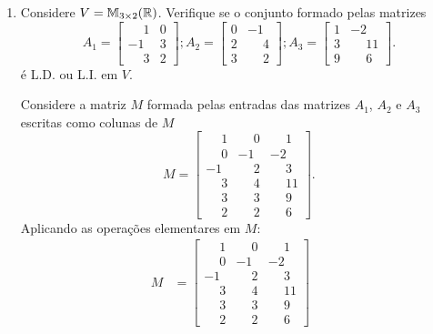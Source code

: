 \begin{exemplo}
\begin{enumerate}[label={\arabic*})]
		\item Considere $V = \mathbb{M}_{3\times 2}(\mathbb{R})$. Verifique se o conjunto formado pelas matrizes
		\[
			A_1 = \begin{bmatrix}
				\phantom{-}1 & 0\\
				-1 & 3\\
				\phantom{-}3 & 2
			\end{bmatrix}; A_2 = \begin{bmatrix}
				0 & -1\\
				2 & \phantom{-}4\\
				3 & \phantom{-}2
			\end{bmatrix}; A_3 = \begin{bmatrix}
				1 & -2\\
				3 & \phantom{-}11\\
				9 & \phantom{-}6
			\end{bmatrix}.
		\]
		\'e L.D. ou L.I. em $V$.
		\begin{solucao}
			Considere a matriz $M$ formada pelas entradas das matrizes $A_1$, $A_2$ e $A_3$ escritas como colunas de $M$
			\[
				M = \begin{bmatrix}
					\phantom{-}1 & \phantom{-}0 & \phantom{-}1\\
					\phantom{-}0 & -1 & -2\\
					-1 & \phantom{-}2 & \phantom{-}3\\
					\phantom{-}3 & \phantom{-}4 & \phantom{-}11\\
					\phantom{-}3 & \phantom{-}3 & \phantom{-}9\\
					\phantom{-}2 & \phantom{-}2 & \phantom{-}6
				\end{bmatrix}.
			\]
			Aplicando as opera\c{c}\~oes elementares em $M$:
			\begin{align*}
				M &= 
					\left[
						\begin{array}{ccc}
		  					\phantom{-}1 & \phantom{-}0 & \phantom{-}1\\
							\phantom{-}0 & -1 & -2\\
							-1 & \phantom{-}2 & \phantom{-}3\\
							\phantom{-}3 & \phantom{-}4 & \phantom{-}11\\
							\phantom{-}3 & \phantom{-}3 & \phantom{-}9\\
							\phantom{-}2 & \phantom{-}2 & \phantom{-}6
     					\end{array}
     				\right]
     				\begin{array}{l}
     					\phantom{x}\\

\end{array}
\end{align*}
\end{solucao}
\end{enumerate}
\end{exemplo}
